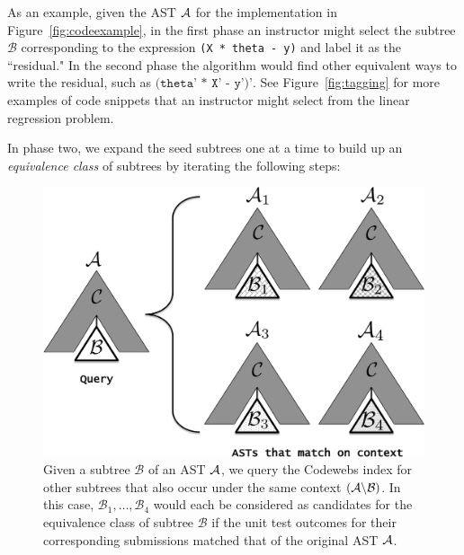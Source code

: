 As an example, given the AST $\mathcal{A}$ for the implementation in 
Figure~\ref{fig:codeexample},
 in the first phase an instructor might select the subtree $\mathcal{B}$ corresponding to the expression \texttt{(X * theta - y)} and label it as the ``residual." In the second phase the algorithm would find other equivalent ways to write the residual, such as $\texttt{(theta' * X' - y')'}$.
See Figure~\ref{fig:tagging} for more  examples of code snippets that an instructor might select from the linear
 regression problem.

In phase two, we expand the seed subtrees one at a time to build up an \emph{equivalence class}
of subtrees by iterating the following steps:
		
\begin{figure}[t!]
\center
\includegraphics[width=.35\textwidth]{img/cartoon.pdf}
\caption[Equivalence class candidates]{
Given a subtree $\mathcal{B}$ of an AST $\mathcal{A}$, we query the Codewebs index
for other subtrees that also occur under the same context $(\mathcal{A}\backslash\mathcal{B})$.
In this case, $\mathcal{B}_1, \dots, \mathcal{B}_4$ would each be considered
as candidates for the equivalence class of subtree $\mathcal{B}$ if the unit test outcomes for their
corresponding submissions matched that of the original AST $\mathcal{A}$.
}
\label{fig:cartoon}
\end{figure}

